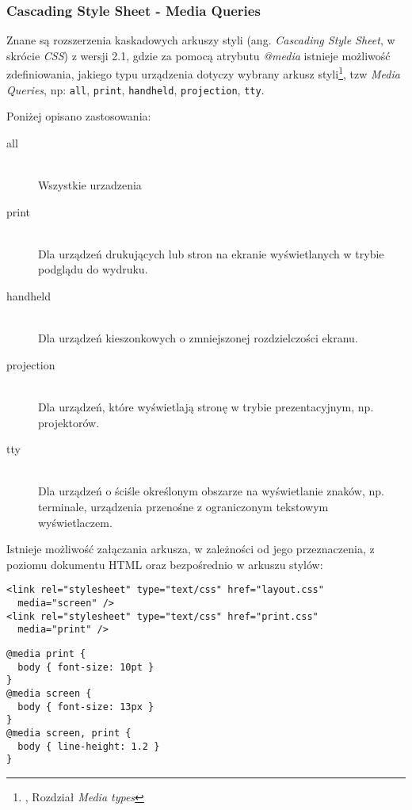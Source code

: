 \subsubsection{Cascading Style Sheet - Media Queries}

Znane są rozszerzenia kaskadowych arkuszy styli (ang. \emph{Cascading Style Sheet}, w skrócie \emph{CSS}) z wersji 2.1\cite{css21}, gdzie za pomocą atrybutu \emph{@media} istnieje możliwość zdefiniowania, jakiego typu urządzenia dotyczy wybrany arkusz styli\footnote{\cite{css21}, Rozdział \emph{Media types}}, tzw \emph{Media Queries}, np: \lstinline{all}, \lstinline{print}, \lstinline{handheld}, \lstinline{projection}, \lstinline{tty}.

Poniżej opisano zastosowania:

\begin{description}
  \item[all] \hfill \\
  Wszystkie urzadzenia
  \item[print] \hfill \\
  Dla urządzeń drukujących lub stron na ekranie wyświetlanych w trybie podglądu do wydruku.
  \item[handheld] \hfill \\
  Dla urządzeń kieszonkowych o zmniejszonej rozdzielczości ekranu.
  \item[projection] \hfill \\
  Dla urządzeń, które wyświetlają stronę w trybie prezentacyjnym, np. projektorów.
  \item[tty] \hfill \\
  Dla urządzeń o ściśle określonym obszarze na wyświetlanie znaków, np. terminale, urządzenia przenośne z ograniczonym tekstowym wyświetlaczem.
\end{description}

Istnieje możliwość załączania arkusza, w zależności od jego przeznaczenia, z poziomu dokumentu HTML oraz bezpośrednio w arkuszu stylów:

\lstset{language=HTML}
\begin{lstlisting}
<link rel="stylesheet" type="text/css" href="layout.css"
  media="screen" />
<link rel="stylesheet" type="text/css" href="print.css"
  media="print" />
\end{lstlisting}

\lstset{language=Octave}
\begin{lstlisting}
@media print {
  body { font-size: 10pt }
}
@media screen {
  body { font-size: 13px }
}
@media screen, print {
  body { line-height: 1.2 }
}
\end{lstlisting}

